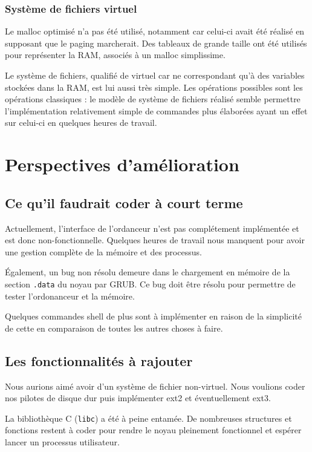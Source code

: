 \documentclass[a4paper, 11pt, twoside]{article}
\begin{document}
\subsubsection{Système de fichiers virtuel}

Le malloc optimisé n'a pas été utilisé, notamment car celui-ci avait été réalisé en supposant
que le paging marcherait. Des tableaux de grande taille ont été utilisés pour représenter
la RAM, associés à un malloc simplissime.

Le système de fichiers, qualifié de virtuel car ne correspondant qu'à des variables stockées
dans la RAM, est lui aussi très simple.
Les opérations possibles sont les opérations classiques : le modèle de système de fichiers
réalisé semble permettre l'implémentation relativement simple de commandes plus élaborées ayant
un effet sur celui-ci en quelques heures de travail.

\section{Perspectives d'amélioration}

\subsection{Ce qu'il faudrait coder à court terme}

Actuellement, l'interface de l'ordanceur n'est pas complétement implémentée et
est donc non-fonctionnelle. Quelques heures de travail nous manquent pour avoir
une gestion complète de la mémoire et des processus.

Également, un bug non résolu demeure dans le chargement en mémoire de la section
\texttt{.data} du noyau par GRUB. Ce bug doit être résolu pour permettre de
tester l'ordonanceur et la mémoire.

Quelques commandes shell de plus sont à implémenter en raison de la simplicité de cette
en comparaison de toutes les autres choses à faire.

\subsection{Les fonctionnalités à rajouter}

Nous aurions aimé avoir d'un système de fichier non-virtuel. Nous voulions coder
nos pilotes de disque dur puis implémenter ext2 et éventuellement ext3.

La bibliothèque C (\texttt{libc}) a été à peine entamée. De nombreuses
structures et fonctions restent à coder pour rendre le noyau pleinement
fonctionnel et espérer lancer un processus utilisateur.
\end{document}
